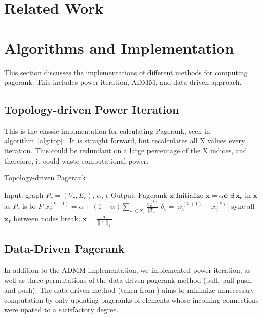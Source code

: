 \documentclass[letterpaper,12pt,onecolumn]{article}
\begin{document}
\section{Related Work}

\section{Algorithms and Implementation}

This section discusses the implementations of different methods for computing pagerank. This includes power iteration, ADMM, and data-driven approach. 

\subsection{Topology-driven Power Iteration}
This is the classic implmentation for calculating Pagerank, seen in algorithm~\ref{alg:top} . It is straight forward, but recalculates all X values every iteration. This could be redundant on a large percentage of the X indices, and therefore, it could waste computational power. 

\begin{algorithm}
\caption{Topology-driven Pagerank}
\label{alg:top}
\begin{algorithmic}[1]
  \STATE Input: graph $P_{r} = (V_r, E_r)$, $\alpha$, $\epsilon$
  \STATE Output: Pagerank $\mathbf{x}$
  \STATE Initialize $\mathbf{x} = \alpha \mathbf{e}$
  \STATE $\exists  \medspace \mathbf{x_r}$ in $\mathbf{x}$ as $P_r$ is to $P$
		\STATE $x_{v}^{(k+1)} = \alpha + (1 - \alpha) \sum_{w \in S_v} \frac{x_{w}^{(k)}}{|T_w|} $
		\STATE $\delta_{v} = | x_{v}^{(k+1)} - x_{v}^{(k)} | $
	\ENDFOR
	\STATE sync all $\mathbf{x_r}$ between nodes
	\IF{$\|\delta \|_{\infty} < \epsilon$}
		\STATE break;
	\ENDIF
  \ENDWHILE
  \STATE $\mathbf{x} = \frac{\mathbf{x} }{\|x\|_{1}}$
\end{algorithmic}
\end{algorithm}

\subsection{Data-Driven Pagerank}
In addition to the ADMM implementation, we implemented power iteration, as well as three permutations of the data-driven pagerank method (pull, pull-push, and push). The data-driven method (taken from \cite{Joyce}) aims to minimize unnecessary computation by only updating pageranks of elements whose incoming connections were upated to a satisfactory degree. 
\end{document}
